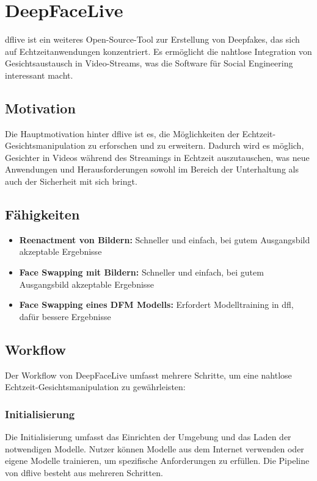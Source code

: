 \section{DeepFaceLive}\label{sec:deepfacelive}
\gls{dflive} ist ein weiteres Open-Source-Tool zur Erstellung von Deepfakes, das sich auf Echtzeitanwendungen konzentriert.
Es ermöglicht die nahtlose Integration von Gesichtsaustausch in Video-Streams, was die Software für Social Engineering interessant macht.

\subsection{Motivation}\label{subsec:motivation_dflive}
Die Hauptmotivation hinter \gls{dflive} ist es, die Möglichkeiten der Echtzeit-Gesichtsmanipulation zu erforschen und zu erweitern.
Dadurch wird es möglich, Gesichter in Videos während des Streamings in Echtzeit auszutauschen, was neue Anwendungen und Herausforderungen sowohl im Bereich der Unterhaltung als auch der Sicherheit mit sich bringt.

\subsection{Fähigkeiten}\label{subsec:fahigkeiten_dflive}
\begin{itemize}
    \item \textbf{Reenactment von Bildern:} Schneller und einfach, bei gutem Ausgangsbild akzeptable Ergebnisse
    \item \textbf{Face Swapping mit Bildern:} Schneller und einfach, bei gutem Ausgangsbild akzeptable Ergebnisse
    \item \textbf{Face Swapping eines DFM Modells:} Erfordert Modelltraining in \gls{dfl}, dafür bessere Ergebnisse
\end{itemize}

\subsection{Workflow}\label{subsec:workflow_dflive}
Der Workflow von DeepFaceLive umfasst mehrere Schritte, um eine nahtlose Echtzeit-Gesichtsmanipulation zu gewährleisten:

\subsubsection{Initialisierung}\label{subsubsec:initialisierung_dflive}
Die Initialisierung umfasst das Einrichten der Umgebung und das Laden der notwendigen Modelle.
Nutzer können Modelle aus dem Internet verwenden oder eigene Modelle trainieren, um spezifische Anforderungen zu erfüllen.
Die Pipeline von \gls{dflive} besteht aus mehreren Schritten.\\

